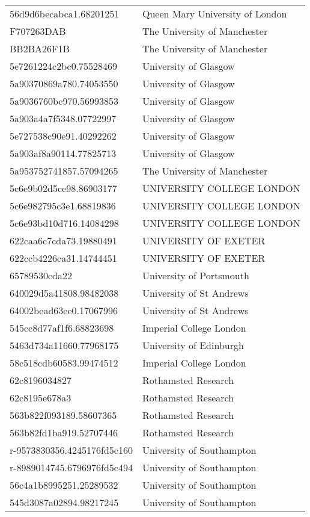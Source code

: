 \begin{tabular}{ll}
56d9d6becabca1.68201251 & Queen Mary University of London \\
F707263DAB & The University of Manchester \\
BB2BA26F1B & The University of Manchester \\
5e7261224c2bc0.75528469 & University of Glasgow \\
5a90370869a780.74053550 & University of Glasgow \\
5a9036760bc970.56993853 & University of Glasgow \\
5a903a4a7f5348.07722997 & University of Glasgow \\
5e727538c90e91.40292262 & University of Glasgow \\
5a903af8a90114.77825713 & University of Glasgow \\
5a953752741857.57094265 & The University of Manchester \\
5c6e9b02d5ce98.86903177 & UNIVERSITY COLLEGE LONDON \\
5c6e982795c3e1.68819836 & UNIVERSITY COLLEGE LONDON \\
5c6e93bd10d716.14084298 & UNIVERSITY COLLEGE LONDON \\
622caa6c7cda73.19880491 & UNIVERSITY OF EXETER \\
622ccb4226ca31.14744451 & UNIVERSITY OF EXETER \\
65789530cda22 & University of Portsmouth \\
640029d5a41808.98482038 & University of St Andrews \\
64002bead63ee0.17067996 & University of St Andrews \\
545cc8d77af1f6.68823698 & Imperial College London \\
5463d734a11660.77968175 & University of Edinburgh \\
58c518cdb60583.99474512 & Imperial College London \\
62c8196034827 & Rothamsted Research \\
62c8195e678a3 & Rothamsted Research \\
563b822f093189.58607365 & Rothamsted Research \\
563b82fd1ba919.52707446 & Rothamsted Research \\
r-9573830356.4245176fd5c160 & University of Southampton \\
r-8989014745.6796976fd5c494 & University of Southampton \\
56c4a1b8995251.25289532 & University of Southampton \\
545d3087a02894.98217245 & University of Southampton \\

\end{tabular}
